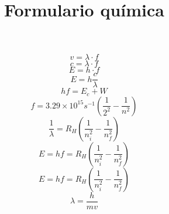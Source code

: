 \documentclass{article}
\title{Formulario química}
\author{}
\date{}
\begin{document}
\maketitle

\begin{equation}
    v=\lambda \cdot f
\end{equation}
\begin{equation}
    c=\lambda \cdot f
\end{equation}
\begin{equation}
      E=h\cdot f
\end{equation}
\begin{equation}
    E=h\frac{c}{\lambda}
\end{equation}
\begin{equation}
    hf=E_c + W
\end{equation}
\begin{equation}
    f=3.29\times 10^{15}s^{-1}(\frac{1}{2^2}-\frac{1}{n^2})
\end{equation}
\begin{equation}
    \frac{1}{\lambda}=R_H(\frac{1}{n_{i}^{2}}-\frac{1}{n_{f}^{2}})
\end{equation}
\begin{equation}
    E=hf=R_H(\frac{1}{n_{i}^{2}}-\frac{1}{n_{f}^{2}})
\end{equation}
\begin{equation}
    E=hf=R_H(\frac{1}{n_{i}^{2}}-\frac{1}{n_{f}^{2}})
\end{equation}
\begin{equation}
    \lambda=\frac{h}{mv}
\end{equation}
\end{document}
